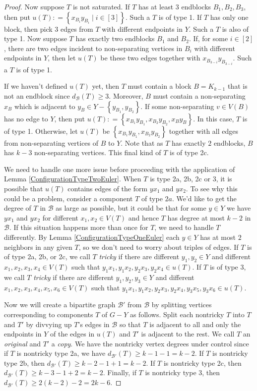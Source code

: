 \documentclass[12pt]{article}
\theoremstyle{plain}
\theoremstyle{definition}
\theoremstyle{remark}
\newcommand{\fancy}[1]{\mathcal{#1}}
\newcommand{\B}{\fancy{B}}
\newcommand{\set}[1]{\left\{ #1 \right\}}
\newcommand{\setbs}[2]{\left\{ #1 \mid #2 \right\}}
\newcommand{\irange}[1]{\left[#1\right]}
\newcommand{\DefinedAs}{\mathrel{\mathop:}=}
\begin{document}
\begin{proof}
Now suppose $T$ is not saturated.  If $T$ has at least $3$ endblocks $B_1, B_2, B_3$, then put $u(T) \DefinedAs \setbs{x_{B_i}y_{B_i}}{i \in \irange{3}}$.  Such a $T$ is of type 1.  If $T$ has only one block, then pick $3$ edges from $T$ with different endpoints in $Y$.  Such a $T$ is also of type 1.  Now suppose $T$ has exactly two endblocks $B_1$ and $B_2$.  If, for some $i \in \irange{2}$, there are two edges incident to non-separating vertices in $B_i$ with different endpoints in $Y$, then let $u(T)$ be these two edges together with $x_{B_{3-i}}y_{B_{3-i}}$.  Such a $T$ is of type 1.

If we haven't defined $u(T)$ yet, then $T$ must contain a block $B = K_{k-1}$ that is not an endblock since $d_{\B}(T) \geq 3$.  Moreover, $B$ must contain a non-separating $x_B$ which is adjacent to $y_B \in Y - \set{y_{B_1}, y_{B_2}}$. If some non-separating $v \in V(B)$ has no edge to $Y$, then put $u(T) \DefinedAs \set{x_{B_1}y_{B_1}, x_{B_2}y_{B_2}, x_{B}y_{B}}$.  In this case, $T$ is of type 1.  Otherwise, let $u(T)$ be $\set{x_{B_1}y_{B_1}, x_{B_2}y_{B_2}}$ together with all edges from non-separating vertices of $B$ to $Y$. Note that as $T$ has exactly $2$ endblocks, $B$ has $k-3$ non-separating vertices.  This final kind of $T$ is of type 2c.

We need to handle one more issue before proceeding with the application of Lemma \ref{ConfigurationTypeTwoEuler}.  When $T$ is type 2a, 2b, 2c or 3, it is possible that $u(T)$ contains edges of the form $yx_1$ and $yx_2$.  To see why this could be a problem, consider a component $T$ of type $2a$.  We'd like to get the degree of $T$ in $\B$ as large as possible, but it could be that for some $y \in Y$ we have $yx_1$ and $yx_2$ for different $x_1, x_2 \in V(T)$ and hence $T$ has degree at most $k-2$ in $\B$.  If this situation happens more than once for $T$, we need to handle $T$ differently.  By Lemma \ref{ConfigurationTypeOneEuler} each $y \in Y$ has at most $2$ neighbors in any given $T$, so we don't need to worry about triples of edges.  If $T$ is of type 2a, 2b, or 2c, we call $T$ \emph{tricky} if there are different $y_1, y_2 \in Y$ and different $x_1, x_2, x_3, x_4 \in V(T)$ such that $y_1x_1, y_1x_2, y_2x_3, y_2x_4 \in u(T)$.  If $T$ is of type 3, we call $T$ \emph{tricky} if there are different $y_1, y_2, y_3 \in Y$ and different $x_1, x_2, x_3, x_4, x_5, x_6 \in V(T)$ such that $y_1x_1, y_1x_2, y_2x_3, y_2x_4, y_3x_5, y_3x_6 \in u(T)$. 

Now we will create a bipartite graph $\B'$ from $\B$ by splitting vertices corresponding to components $T$ of $G-Y$ as follows. Split each nontricky $T$ into $T$ and $T'$ by divvying up $T$'s edges in $\B$ so that $T$ is adjacent to all and only the endpoints in $Y$ of the edges in $u(T)$ and $T'$ is adjacent to the rest.  We call $T$ an \emph{original} and $T'$ a \emph{copy}. We have the nontricky vertex degrees under control since if $T$ is nontricky type 2a, we have $d_{\B'}(T) \geq k-1 - 1 = k-2$.  If $T$ is nontricky type 2b, then $d_{\B'}(T) \geq k-2 -1 + 1 = k-2$.  If $T$ is nontricky type 2c, then $d_{\B'}(T) \geq k-3 - 1 + 2 = k-2$.  Finally, if $T$ is nontricky type 3, then $d_{\B'}(T) \geq 2(k-2) - 2 = 2k-6$. 


\end{proof}
\end{document}
